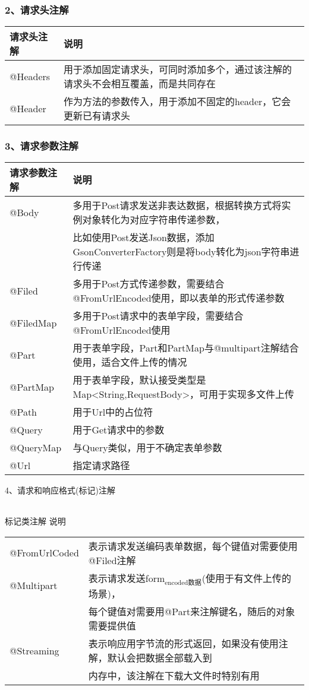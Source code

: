 \documentclass[9pt, b5paper]{article}
\begin{document}
\subsubsection{2、请求头注解}
\label{sec-1-1-2}
\begin{center}
\begin{tabular}{ll}
\hline
请求头注解 & 说明\\
\hline
@Headers & 用于添加固定请求头，可同时添加多个，通过该注解的请求头不会相互覆盖，而是共同存在\\
@Header & 作为方法的参数传入，用于添加不固定的header，它会更新已有请求头\\
\hline
\end{tabular}
\end{center}
\subsubsection{3、请求参数注解}
\label{sec-1-1-3}
\begin{center}
\begin{tabular}{ll}
\hline
请求参数注解 & 说明\\
\hline
@Body & 多用于Post请求发送非表达数据，根据转换方式将实例对象转化为对应字符串传递参数，\\
 & 比如使用Post发送Json数据，添加GsonConverterFactory则是将body转化为json字符串进行传递\\
@Filed & 多用于Post方式传递参数，需要结合@FromUrlEncoded使用，即以表单的形式传递参数\\
@FiledMap & 多用于Post请求中的表单字段，需要结合@FromUrlEncoded使用\\
@Part & 用于表单字段，Part和PartMap与@multipart注解结合使用，适合文件上传的情况\\
@PartMap & 用于表单字段，默认接受类型是Map<String,RequestBody>，可用于实现多文件上传\\
@Path & 用于Url中的占位符\\
@Query & 用于Get请求中的参数\\
@QueryMap & 与Query类似，用于不确定表单参数\\
@Url & 指定请求路径\\
\hline
\end{tabular}
\end{center}
4、请求和响应格式(标记)注解
\begin{center}
\begin{tabular}{}
\end{tabular}
\end{center}
标记类注解    说明
\begin{center}
\begin{tabular}{ll}
\hline
@FromUrlCoded & 表示请求发送编码表单数据，每个键值对需要使用@Filed注解\\
@Multipart & 表示请求发送form$_{\text{encoded数据}}$(使用于有文件上传的场景)，\\
 & 每个键值对需要用@Part来注解键名，随后的对象需要提供值\\
@Streaming & 表示响应用字节流的形式返回，如果没有使用注解，默认会把数据全部载入到\\
 & 内存中，该注解在下载大文件时特别有用\\
\hline
\end{tabular}
\end{center}
\end{document}
